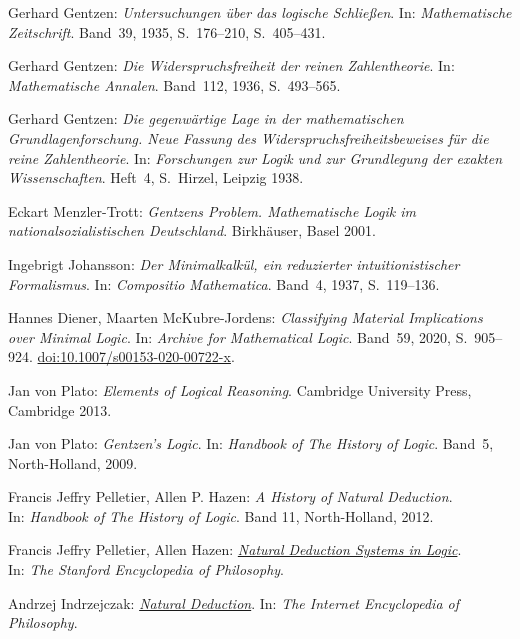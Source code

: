 
\begin{thebibliography}{00}

Gerhard Gentzen: \emph{Untersuchungen über das logische Schließen}.
In: \emph{Mathematische Zeitschrift}. Band~39, 1935, S.~176--210,
S.~405--431.

Gerhard Gentzen: \emph{Die Widerspruchsfreiheit der reinen
Zahlentheorie}. In: \emph{Mathematische Annalen}. Band~112,
1936, S.~493--565.

Gerhard Gentzen: \emph{Die gegenwärtige Lage in der mathematischen
Grundlagenforschung. Neue Fassung des Widerspruchsfreiheitsbeweises für
die reine Zahlentheorie}. In: \emph{Forschungen zur Logik und zur
Grundlegung der exakten Wissenschaften}. Heft~4, S.~Hirzel,
Leipzig 1938.

Eckart Menzler-Trott: \emph{Gentzens Problem. Mathematische Logik
im nationalsozialistischen Deutschland}. Birkhäuser, Basel 2001.

Ingebrigt Johansson: \emph{Der Minimalkalkül, ein reduzierter
intuitionistischer Formalismus}. In: \emph{Compositio Mathematica}.
Band~4, 1937, S.~119–136.

Hannes Diener, Maarten McKubre-Jordens: \emph{Classifying Material
Implications over Minimal Logic}. In: \emph{Archive for Mathematical
Logic}. Band~59, 2020, S.~905--924.
\href{https://doi.org/10.1007/s00153-020-00722-x}%
{doi:10.1007/s00153-020-00722-x}.

Jan von Plato: \emph{Elements of Logical Reasoning}.
Cambridge University Press, Cambridge 2013.

Jan von Plato: \emph{Gentzen's Logic}. In: \emph{Handbook of The
History of Logic}. Band~5, North-Holland, 2009.

Francis Jeffry Pelletier, Allen P. Hazen: \emph{A History of Natural
Deduction}.\\ In: \emph{Handbook of The History of Logic}.
Band 11, North-Holland, 2012.

 Francis Jeffry Pelletier, Allen Hazen:
\href{https://plato.stanford.edu/entries/natural-deduction/}%
{\emph{Natural Deduction Systems in Logic}}.\\
In: \emph{The Stanford Encyclopedia of Philosophy}.

Andrzej Indrzejczak:
\href{https://iep.utm.edu/natural-deduction/}{\emph{Natural Deduction}}.
In: \emph{The Internet Encyclopedia of Philosophy}.


\end{thebibliography}
